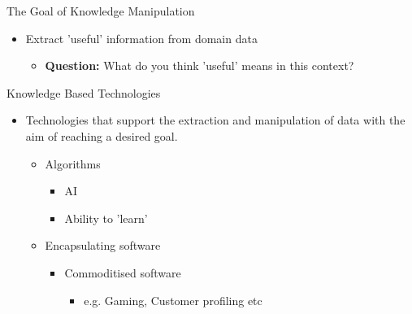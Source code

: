 \documentclass[%
pdf,
colorBG,
slideColor,
tcrico,
]{prosper}
\begin{document}

\begin{slide}{The Goal of Knowledge Manipulation}
\begin{itemize}
 \item  Extract 'useful' information from domain data
	\begin{itemize}
	\item \textbf{Question:} What do you think 'useful' means in this context?
	\end{itemize}
\end{itemize}
\end{slide}



\begin{slide}{Knowledge Based Technologies}
\begin{itemize}
 \item  Technologies that support the extraction and manipulation of data with the aim of reaching a desired goal.
	\begin{itemize}
	\item Algorithms
		\begin{itemize}
			\item AI
			\item Ability to 'learn'
		\end{itemize}
	\item Encapsulating software 
		\begin{itemize}
		\item Commoditised software 
			\begin{itemize}
			\item e.g. Gaming, Customer profiling etc
			\end{itemize}
		\end{itemize}
	\end{itemize}
\end{itemize}
\end{slide}

\end{document}
